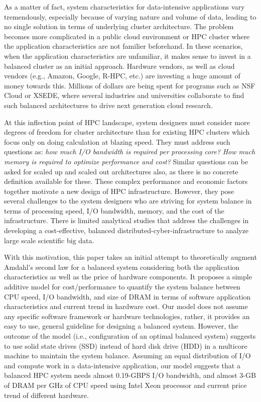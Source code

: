 \documentclass[journal]{IEEEtran}
\begin{document}
As a matter of fact, system characteristics for data-intensive applications vary tremendously, especially because of varying nature and volume of data, leading to no single solution in terms of underlying cluster architecture. The problem becomes more complicated in a public cloud environment or HPC cluster where the application characteristics are not familier beforehand. In these scenarios, when the application characteristics are unfamiliar, it makes sense to invest in a balanced cluster as an initial approach. Hardware vendors, as well as cloud vendors (e.g., Amazon, Google, R-HPC, etc.) are investing a huge amount of money towards this. Millions of dollars are being spent for programs such as NSF Cloud or XSEDE, where several industries and universities collaborate to find such balanced architectures to drive next generation cloud research. 

At this inflection point of HPC landscape, system designers must consider more degrees of freedom for cluster architecture than for existing HPC clusters which focus only on doing calculation at blazing speed. They must address such questions as: \textit{how much I/O bandwidth is required per processing core?} \textit{How much memory is required to optimize performance and cost?}  Similar questions can be asked for scaled up and scaled out architectures also, as there is no concrete definition available for these. These complex performance and economic factors together motivate a new design of HPC infrastructure. However, they pose several challenges to the system designers who are striving for system balance in terms of processing speed, I/O bandwidth, memory, and the cost of the infrastructure. There is limited analytical studies that address the challenges in developing a cost-effective, balanced distributed-cyber-infrastructure to analyze large scale scientific big data.
 
With this motivation, this paper takes an initial attempt to theoretically augment Amdahl's second law for a balanced system considering both the application characteristics as well as the price of hardware components. It proposes a simple additive model for cost/performance to quantify the system balance between CPU speed, I/O bandwidth, and size of DRAM in terms of software application characteristics and current trend in hardware cost. Our model does not assume any specific software framework or hardware technologies, rather, it provides an easy to use, general guideline for designing a balanced system. However, the outcome of the model (i.e., configuration of an optimal balanced system) suggests to use solid state drives (SSD) instead of hard disk drive (HDD) in a multicore machine to maintain the system balance. Assuming an equal distribution of I/O  and compute work in a data-intensive application, our model suggests that a balanced HPC system needs almost 0.19-GBPS I/O bandwidth, and almost 3-GB of DRAM per GHz of CPU speed using Intel Xeon processor  and current price trend of different hardware. 
\end{document}
